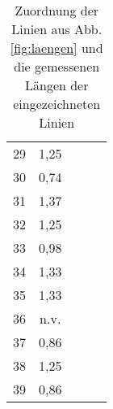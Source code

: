 \begin{table}[htbp]
\begin{tabular}{SSSSS}
    29    & 1,25  &       &       &  \\
    30    & 0,74  &       &       &  \\
    31    & 1,37  &       &       &  \\
    32    & 1,25  &       &       &  \\
    33    & 0,98  &       &       &  \\
    34    & 1,33  &       &       &  \\
    35    & 1,33  &       &       &  \\
    36    & {n.v.}&       &       &  \\
    37    & 0,86  &       &       &  \\
    38    & 1,25  &       &       &  \\
    39    & 0,86  &       &       &  \\
    \bottomrule
    \end{tabular}%
  \caption{Zuordnung der Linien aus Abb. \ref{fig:laengen} und die gemessenen L\"angen der eingezeichneten Linien}
  \label{tab:laengen}%
\end{table}%
